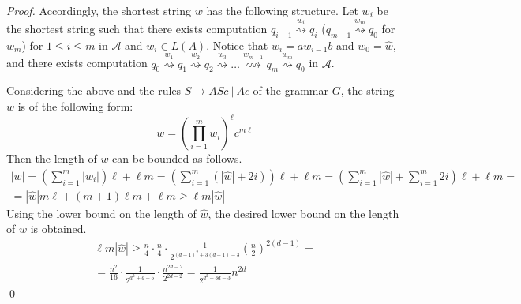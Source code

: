 \documentclass[runningheads]{llncs}
\newcommand{\xra}[1]{\overset{#1}{\rightsquigarrow}}
\begin{document}
\begin{proof}
Accordingly, the shortest string $w$ has the following structure.
Let $w_i$ be the shortest string
such that there exists computation $q_{i-1} \xra{w_i} q_i$ ($q_{m-1} \xra{w_m} q_0$
for $w_m$) for $1 \leqslant i \leqslant m$ in $\mathcal{A}$ and $w_i \in L(A)$.
Notice that $w_i = a w_{i-1} b$ and $w_0 = \widehat{w}$,
and there exists computation
$q_{0} \xra{w_1} q_1 \xra{w_2} q_2 \xra{w_3} \ldots \xra{w_{m-1}} q_{m} \xra{w_m} q_0$
in $\mathcal{A}$.

Considering the above and the rules $S \to ASc \ | \ Ac$ of the grammar $G$,
the string $w$ is of the following form:
\begin{equation*}
w = ({\prod_{i=1}^m w_i})^{\ell}{c}^{m\ell}
\end{equation*}
Then the length of $w$ can be bounded as follows.
\begin{multline*}
	|w|
		=
	({\sum_{i=1}^m |w_i|})\ell + \ell m = (\sum_{i=1}^m (|\widehat{w}| + 2i))\ell + \ell m
		=
	(\sum_{i=1}^m |\widehat{w}| + \sum_{i=1}^m 2i)\ell + \ell m
		= \\ =
	|\widehat{w}| m \ell +  (m+1)\ell m + \ell m \geqslant \ell m |\widehat{w}|
\end{multline*}
Using the lower bound on the length of $\widehat{w}$,
the desired lower bound on the length of $w$ is obtained.
\begin{multline*}
	\ell m |\widehat{w}|
		\geqslant
	\frac{n}{4} \cdot \frac{n}{4} \cdot 
	\frac{1}{2^{(d-1)^2 + 3(d-1) - 3}} \left(\frac{n}{2}\right)^{2(d-1)}
		= \\ = %
	\frac{n^2}{16} \cdot 
	\frac{1}{2^{d^2 + d - 5}} \cdot \frac{n^{2d-2}}{2^{2d-2}}
		= %
	\frac{1}{2^{d^2 + 3d -3}} n^{2d}
\end{multline*}
\qed
\end{proof}
\end{document}
